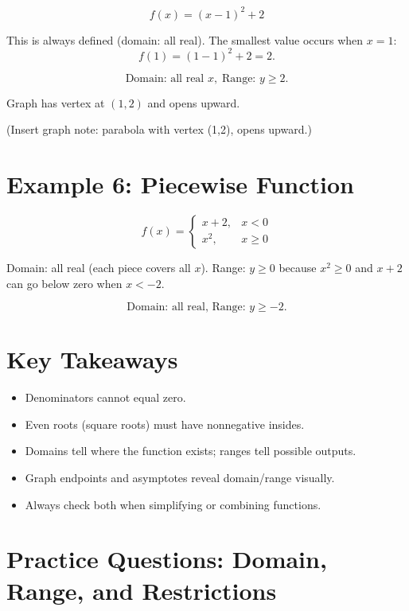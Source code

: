 \documentclass[12pt]{article}
\begin{document}
\[
f(x) = (x - 1)^2 + 2
\]

This is always defined (domain: all real).  
The smallest value occurs when \(x = 1\):
\[
f(1) = (1 - 1)^2 + 2 = 2.
\]

\[
\boxed{\text{Domain: all real } x, \; \text{Range: } y \ge 2.}
\]

Graph has vertex at \((1, 2)\) and opens upward.

(Insert graph note: parabola with vertex (1,2), opens upward.)

\section*{Example 6: Piecewise Function}

\[
f(x) =
\begin{cases}
x + 2, & x < 0 \\
x^2, & x \ge 0
\end{cases}
\]

Domain: all real (each piece covers all \(x\)).  
Range: \(y \ge 0\) because \(x^2 \ge 0\) and \(x+2\) can go below zero when \(x < -2.\)

\[
\boxed{\text{Domain: all real, Range: } y \ge -2.}
\]

\section*{Key Takeaways}
\begin{itemize}
  \item Denominators cannot equal zero.
  \item Even roots (square roots) must have nonnegative insides.
  \item Domains tell where the function exists; ranges tell possible outputs.
  \item Graph endpoints and asymptotes reveal domain/range visually.
  \item Always check both when simplifying or combining functions.
\end{itemize}

\newpage


\section*{Practice Questions: Domain, Range, and Restrictions}
\end{document}
